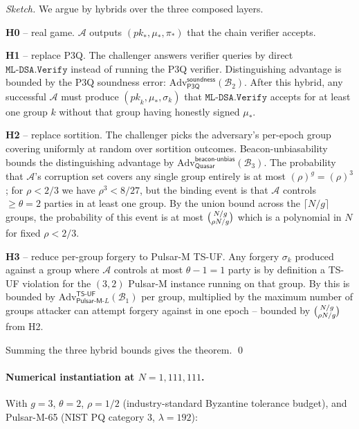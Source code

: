 \begin{proof}[Sketch]
We argue by hybrids over the three composed layers.

\textbf{H0} -- real game. $\mathcal{A}$ outputs
$(\mathit{pk}_*, \mu_*, \pi_*)$ that the chain verifier accepts.

\textbf{H1} -- replace P3Q. The challenger answers verifier queries
by direct $\mathtt{ML\text{-}DSA.Verify}$ instead of running the P3Q
verifier. Distinguishing advantage is bounded by the P3Q soundness
error:
$\mathrm{Adv}^{\mathsf{soundness}}_{\mathsf{P3Q}}(\mathcal{B}_2)$.
After this hybrid, any successful $\mathcal{A}$ must produce
$(\mathit{pk}_k, \mu_*, \sigma_k)$ that
$\mathtt{ML\text{-}DSA.Verify}$ accepts for at least one group $k$
without that group having honestly signed $\mu_*$.

\textbf{H2} -- replace sortition. The challenger picks the
adversary's per-epoch group covering uniformly at random over
sortition outcomes. Beacon-unbiasability bounds the distinguishing
advantage by
$\mathrm{Adv}^{\mathsf{beacon\text{-}unbias}}_{\mathsf{Quasar}}(\mathcal{B}_3)$.
The probability that $\mathcal{A}$'s corruption set covers any
single group entirely is at most $(\rho)^g = (\rho)^3$; for
$\rho < 2/3$ we have $\rho^3 < 8/27$, but the binding event is that
$\mathcal{A}$ controls $\ge \theta = 2$ parties in at least one
group. By the union bound across the $\lceil N/g \rceil$ groups, the
probability of this event is at most
$\tbinom{N/g}{\rho N / g}$ which is a polynomial in $N$ for fixed
$\rho < 2/3$.

\textbf{H3} -- reduce per-group forgery to Pulsar-M TS-UF. Any
forgery $\sigma_k$ produced against a group where $\mathcal{A}$
controls at most $\theta - 1 = 1$ party is by definition a
TS-UF violation for the $(3, 2)$ Pulsar-M instance running on that
group. By  this is bounded by
$\mathrm{Adv}^{\mathsf{TS\text{-}UF}}_{\mathsf{Pulsar\text{-}M}\text{-}L}(\mathcal{B}_1)$
per group, multiplied by the maximum number of groups attacker can
attempt forgery against in one epoch -- bounded by $\tbinom{N/g}{\rho
N/g}$ from H2.

Summing the three hybrid bounds gives the theorem. \qed
\end{proof}

\paragraph{Numerical instantiation at $N = 1{,}111{,}111$.}
With $g = 3$, $\theta = 2$, $\rho = 1/2$ (industry-standard
Byzantine tolerance budget), and Pulsar-M-65 (NIST PQ category 3,
$\lambda = 192$):


